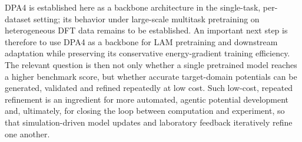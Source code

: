 
DPA4 is established here as a backbone architecture in the single-task, per-dataset setting; its behavior under large-scale multitask pretraining on heterogeneous DFT data remains to be established.
An important next step is therefore to use DPA4 as a backbone for LAM pretraining and downstream adaptation while preserving its conservative energy-gradient training efficiency.
The relevant question is then not only whether a single pretrained model reaches a higher benchmark score, but whether accurate target-domain potentials can be generated, validated and refined repeatedly at low cost.
Such low-cost, repeated refinement is an ingredient for more automated, agentic potential development and, ultimately, for closing the loop between computation and experiment, so that simulation-driven model updates and laboratory feedback iteratively refine one another.

